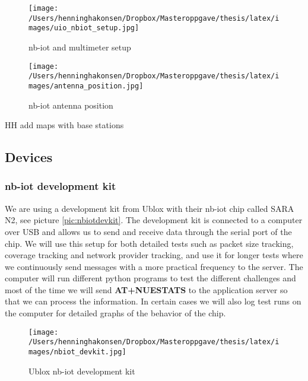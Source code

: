 \documentclass[USenglish]{ifimaster}  %
\begin{document}
\begin{figure}[ht]
  \centering\texttt{[image: /Users/henninghakonsen/Dropbox/Masteroppgave/thesis/latex/images/uio\_nbiot\_setup.jpg]}
  \caption{\acrshort{nb-iot} and multimeter setup}
  \label{pic:uio_nbiot_setup}
\end{figure}

\begin{figure}[ht]
  \centering\texttt{[image: /Users/henninghakonsen/Dropbox/Masteroppgave/thesis/latex/images/antenna\_position.jpg]}
  \caption{\acrshort{nb-iot} antenna position}
  \label{pic:antenna_position}
\end{figure}

HH add maps with base stations

\subsection{Devices} \label{ssection:devices}
\subsubsection{\acrshort{nb-iot} development kit}
We are using a development kit from Ublox with their \acrshort{nb-iot} chip called SARA N2, see picture \vref{pic:nbiotdevkit}. The development kit is connected to a computer over USB and allows us to send and receive data through the serial port of the chip. We will use this setup for both detailed tests such as packet size tracking, coverage tracking and network provider tracking, and use it for longer tests where we continuously send messages with a more practical frequency to the server. The computer will run different python programs to test the different challenges and most of the time we will send \textbf{AT+NUESTATS} to the application server so that we can process the information. In certain cases we will also log test runs on the computer for detailed graphs of the behavior of the chip.

\begin{figure}[ht]
  \centering\texttt{[image: /Users/henninghakonsen/Dropbox/Masteroppgave/thesis/latex/images/nbiot\_devkit.jpg]}
  \caption{Ublox \acrshort{nb-iot} development kit}
  \label{pic:nbiotdevkit}
\end{figure}
\end{document}
